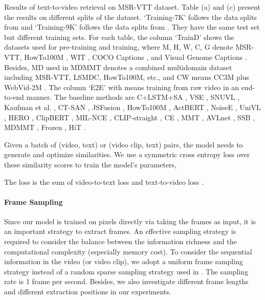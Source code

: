 \documentclass[11pt]{article}
\begin{document}
\begin{table*}[!t]
\begin{subtable}{.5\linewidth}
\begin{subtable}{1.\linewidth}
			\end{subtable} 
		\end{subtable} 
		\caption{Results of text-to-video retrieval on MSR-VTT dataset. Table (a) and (c) present the results on different splits of the dataset. `Training-7K' follows the data splits from \cite{miech2019howto100m} and `Training-9K' follows the data splits from \cite{Gabeur2020MMT}. They have the same test set but different training sets. For each table, the column `TrainD' shows the datasets used for pre-training and training, where M, H, W, C, G denote MSR-VTT, HowTo100M \cite{miech2019howto100m}, WIT \cite{radford2021learning}, COCO Captions \cite{Chen2015COCO}, and Visual Genome Captions \cite{Krishna2017Genome}. Besides, MD used in MDMMT\cite{Dzabraev2021MDMMT} denotes a combined multidomain dataset including MSR-VTT, LSMDC, HowTo100M, etc., and CW means CC3M \cite{sharma2018conceptual} plus WebVid-2M \cite{Bain2021Frozen}. The column `E2E' with \checkmark means training from raw video in an end-to-end manner. The baseline methods are C+LSTM+SA \cite{Torabi2016Learning}, VSE \cite{kiros2014unifying}, SNUVL \cite{Yu2016VideoCaptioning}, Kaufman et al. \citet{Kaufman2017Temporal}, CT-SAN \cite{Yu2017End}, JSFusion \cite{yu2018joint}, HowTo100M \cite{miech2019howto100m}, ActBERT \cite{Zhu_2020_CVPR}, NoiseE \cite{Amrani2020Noise}, UniVL \cite{Luo2020UniVL}, HERO \cite{Li2020HERO}, ClipBERT \cite{lei2021less}, MIL-NCE \cite{miech19endtoend}, CLIP-straight \cite{PortilloQuintero2021}, CE \cite{Liu2019CE}, MMT \cite{Gabeur2020MMT}, AVLnet \cite{Rouditchenko2020}, SSB \cite{patrick2021supportset}, MDMMT \cite{Dzabraev2021MDMMT}, Frozen \cite{Bain2021Frozen}, HiT \cite{Liu2021HiT}.}
		\label{tab:result_of_retrieval_MSR-VTT}
	\end{table*}
	Given a batch of  (video, text) or (video clip, text) pairs, the model needs to generate and optimize  similarities. We use a symmetric cross entropy loss over these similarity scores to train the model's parameters,
	
	The loss  is the sum of video-to-text loss  and text-to-video loss .

	\paragraph{Frame Sampling}
	Since our model is trained on pixels directly via taking the frames as input, it is an important strategy to extract frames. An effective sampling strategy is required to consider the balance between the information richness and the computational complexity (especially memory cost). To consider the sequential information in the video (or video clip), we adopt a uniform frame sampling strategy instead of a random sparse sampling strategy used in \cite{lei2021less}. The sampling rate is 1 frame per second. Besides, we also investigate different frame lengths and different extraction positions in our experiments.
\end{document}
